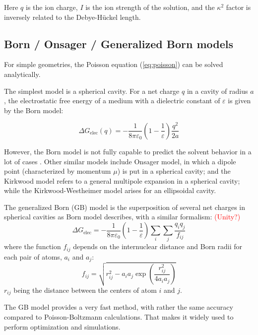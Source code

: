 Here $q$ is the ion charge, $I$ is the ion strength of the solution,
and the $\kappa^{2}$ factor is inversely related to the Debye-Hückel
length. 


\subsection{Born / Onsager / Generalized Born models\label{sub:Born-/-Onsager}}

For simple geometries, the Poisson equation (\ref{eq:poisson}) can
be solved analytically.

The simplest model is a spherical cavity. For a net charge $q$ in
a cavity of radius $a$, the electrostatic free energy of a medium
with a dielectric constant of $\varepsilon$ is given by the Born
model: 

\begin{equation}
\Delta G_{\mathrm{elec}}(q)=-\dfrac{1}{8\pi\varepsilon_{0}}\left(1-\frac{1}{\varepsilon}\right)\frac{q^{2}}{2a}
\end{equation}


However, the Born model is not fully capable to predict the solvent
behavior in a lot of cases \citep{Jensen}. Other similar models include
Onsager model, in which a dipole point (characterized by momentum
$\mu$) is put in a spherical cavity; and the Kirkwood model refers
to a general multipole expansion in a spherical cavity; while the
Kirkwood-Westheimer model arises for an ellipsoidal cavity.

The generalized Born (GB) model is the superposition of several net
charges in spherical cavities as Born model describes, with a similar
formalism: \textcolor{red}{(Unity?)}
\begin{equation}
\Delta G_{\mathrm{elec}}=-\dfrac{1}{8\pi\varepsilon_{0}}\left(1-\frac{1}{\varepsilon}\right)\sum_{i}\sum_{j}\frac{q_{i}q_{j}}{f_{ij}}
\end{equation}
where the function $f_{ij}$ depends on the internuclear distance
and Born radii for each pair of atoms, $a_{i}$ and $a_{j}$:
\begin{equation}
f_{ij}=\sqrt{r_{ij}^{2}-a_{i}a_{j}\exp\left(\frac{r_{ij}^{2}}{4a_{i}a_{j}}\right)}
\end{equation}
$r_{ij}$ being the distance between the centers of atom $i$ and
$j$. 

The GB model provides a very fast method, with rather the same accuracy
compared to Poisson-Boltzmann calculations. That makes it widely used
to perform optimization and simulations.


